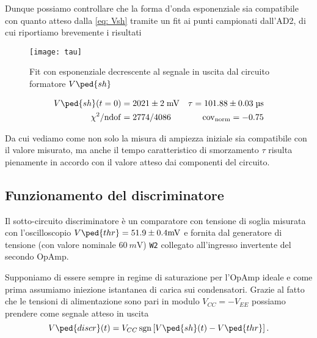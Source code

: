 \documentclass[10pt, a4paper, italian]{article}
\begin{document}
Dunque possiamo controllare che la forma d'onda esponenziale sia compatibile
con quanto atteso dalla \eqref{eq: Vsh} tramite un fit ai punti campionati
dall'AD2, di cui riportiamo brevemente i risultati
\begin{figure}[htbp]
    \centering
	\texttt{[image: tau]}
    \caption{Fit con esponenziale decrescente al segnale in uscita dal
    circuito formatore $V\ped{sh}$ \label{fig: tau}}
\end{figure}
\begin{align*}
V\ped{sh} (t=0) &= 2021 \pm 2 \; \si{m\V}
&\tau = 101.88 \pm 0.03 \; \si{\micro\s} \\
\chi^2/\mathrm{ndof} &= 2774/4086 &\mathrm{cov_{norm}} = -0.75
\end{align*}

Da cui vediamo come non solo la misura di ampiezza iniziale sia compatibile
con il valore misurato, ma anche il tempo caratteristico di smorzamento $\tau$
risulta pienamente in accordo con il valore atteso dai componenti del
circuito.

\setcounter{subsection}{3}
\subsection{Funzionamento del discriminatore}\label{sub: discr}
Il sotto-circuito discriminatore è un comparatore con tensione di soglia
misurata con l'oscilloscopio $V\ped{thr} = 51.9 \pm 0.4 \si{m\V}$ e fornita
dal generatore di tensione (con valore nominale $\SI{60}{m\V}$) \verb+W2+
collegato all'ingresso invertente del secondo OpAmp.

Supponiamo di essere sempre in regime di saturazione per l'OpAmp ideale e
come prima assumiamo iniezione istantanea di carica sui condensatori. 
Grazie al fatto che le tensioni di alimentazione sono pari in modulo
$V_{CC} = - V_{EE}$ possiamo prendere come segnale atteso in uscita
\begin{equation}\label{eq: Vdiscr}
V\ped{discr} (t) = V_{CC} \sgn\left[V\ped{sh}(t) - V\ped{thr}\right].
\end{equation}
\end{document}
